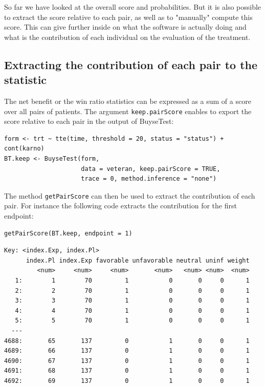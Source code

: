 \documentclass[12pt]{article}
\begin{document}
So far we have looked at the overall score and probabilities. But it
is also possible to extract the score relative to each pair, as well
as to "manually" compute this score. This can give further inside on
what the software is actually doing and what is the contribution of
each individual on the evaluation of the treatment.

\subsection{Extracting the contribution of each pair to the statistic}
\label{sec:org3b09bdc}
The net benefit or the win ratio statistics can be expressed as a sum
of a score over all pairs of patients. The argument \texttt{keep.pairScore}
enables to export the score relative to each pair in the output of
BuyseTest:
\lstset{language=r,label= ,caption= ,captionpos=b,numbers=none}
\begin{lstlisting}
form <- trt ~ tte(time, threshold = 20, status = "status") + cont(karno)
BT.keep <- BuyseTest(form,
                     data = veteran, keep.pairScore = TRUE, 
                     trace = 0, method.inference = "none")
\end{lstlisting}

The method \texttt{getPairScore} can then be used to extract the contribution
of each pair. For instance the following code extracts the
contribution for the first endpoint:
\lstset{language=r,label= ,caption= ,captionpos=b,numbers=none}
\begin{lstlisting}
getPairScore(BT.keep, endpoint = 1)
\end{lstlisting}

\begin{verbatim}
Key: <index.Exp, index.Pl>
      index.Pl index.Exp favorable unfavorable neutral uninf weight
         <num>     <num>     <num>       <num>   <num> <num>  <num>
   1:        1        70         1           0       0     0      1
   2:        2        70         1           0       0     0      1
   3:        3        70         1           0       0     0      1
   4:        4        70         1           0       0     0      1
   5:        5        70         1           0       0     0      1
  ---                                                              
4688:       65       137         0           1       0     0      1
4689:       66       137         0           1       0     0      1
4690:       67       137         0           1       0     0      1
4691:       68       137         0           1       0     0      1
4692:       69       137         0           1       0     0      1
\end{verbatim}
\end{document}
